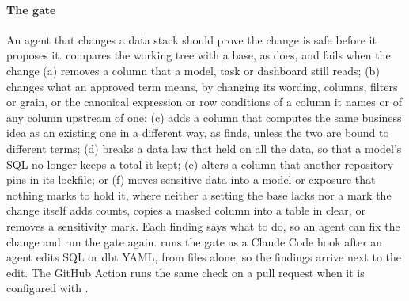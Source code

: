 \paragraph{The gate} An agent that changes a data stack should prove the change is safe before it
proposes it.  compares the working tree with a base, as  does, and
fails when the change (a) removes a column that a model, task or dashboard still reads; (b)
changes what an approved term means, by changing its wording, columns, filters or grain, or the
canonical expression or row conditions of a column it names or of any column upstream of one;
(c) adds a column that computes the same business idea as an existing one in a different way, as
 finds, unless the two are bound to different terms; (d) breaks a data law that held
on all the data, so that a model's SQL no longer keeps a total it kept; (e) alters a column that
another repository pins in its lockfile; or (f) moves sensitive data into a model or exposure that
nothing marks to hold it, where neither a setting the base lacks nor a mark the change itself adds
counts, copies a masked column into a table in clear, or removes a sensitivity mark. Each finding says what to do,
so an agent can fix the change and run the gate again.  runs the gate as a
Claude Code hook after an agent edits SQL or dbt YAML, from files alone, so the findings arrive
next to the edit. The GitHub Action runs the same check on a
pull request when it is configured with .
